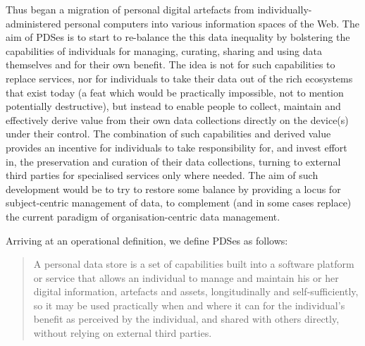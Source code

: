 \documentclass[letterpaper]{sig-alternate}
\begin{document}
Thus began a migration of personal digital artefacts from individually-administered personal computers into various information spaces of the Web. The aim of PDSes is to start to re-balance the this data inequality by bolstering the capabilities of individuals for managing, curating, sharing and using data themselves and for their own benefit. The idea is not for such capabilities to replace services, nor for individuals to take their data out of the rich ecosystems that exist today (a feat which would be practically impossible, not to mention potentially destructive), but instead to enable people to collect, maintain and effectively derive value from their own data collections directly on the device(s) under their control. The combination of such capabilities and derived value provides an incentive for individuals to take responsibility for, and invest effort in, the preservation and curation of their data collections, turning to external third parties for specialised services only where needed. The aim of such development would be to try to restore some balance by providing a locus for subject-centric management of data, to complement (and in some cases replace) the current paradigm of organisation-centric data management.

Arriving at an operational definition, we define PDSes as follows:

\begin{quote}

	A personal data store is a set of capabilities built into a software platform or service that allows an individual to manage and maintain his or her digital information, artefacts and assets, longitudinally and self-sufficiently, so it may be used practically when and where it can for the individual's benefit as perceived by the individual, and shared with others directly, without relying on external third parties. 

\end{quote}
\end{document}
